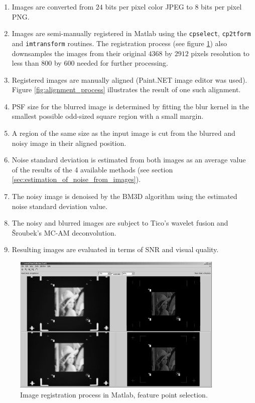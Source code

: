 \documentclass[12pt,notitlepage]{report}
\begin{document}
\begin{enumerate}
\item Images are converted from $24$ bits per pixel color JPEG to $8$ bits per pixel PNG.
\item Images are semi-manually registered in Matlab using the \texttt{cpselect}, \texttt{cp2tform} and \texttt{imtransform} routines. The registration process (see figure \ref{fig:registration_process}) also downsamples the images from their original $4368$ by $2912$ pixels resolution to less than $800$ by $600$ needed for further processing. 
\item Registered images are manually aligned (Paint.NET image editor was used). Figure \ref{fig:alignment_process} illustrates the result of one such alignment.
\item PSF size for the blurred image is determined by fitting the blur kernel in the smallest possible odd-sized square region with a small margin.
\item A region of the same size as the input image is cut from the blurred and noisy image in their aligned position.
\item Noise standard deviation is estimated from both images as an average value of the results of the 4 available methods (see section \ref{sec:estimation_of_noise_from_images}).
\item The noisy image is denoised by the BM3D algorithm using the estimated noise standard deviation value.
\item The noisy and blurred images are subject to Tico's wavelet fusion and Šroubek's MC-AM deconvolution.
\item Resulting images are evaluated in terms of SNR and visual quality.
\end{enumerate}

\begin{figure}[h]
 \centering
  \includegraphics[width=0.9\textwidth]{registration_process.png}
 \caption[Image registration process in Matlab, feature point selection]{Image registration process in Matlab, feature point selection.}
 \label{fig:registration_process}
\end{figure}
\end{document}
